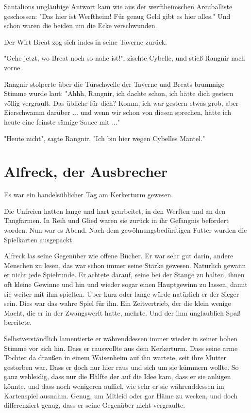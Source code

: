 Santalions ungläubige Antwort kam wie aus der werftheimschen Arcuballiste geschossen: "Das hier ist Werftheim! Für genug Geld gibt es hier alles." Und schon waren die beiden um die Ecke verschwunden.

Der Wirt Breat zog sich indes in seine Taverne zurück. 

"Gehe jetzt, wo Breat noch so nahe ist!", zischte Cybelle, und stieß Rangnir nach vorne. 

Rangnir stolperte über die Türschwelle der Taverne und Breats brummige Stimme wurde laut: 
"Ahhh, Rangnir, ich dachte schon, ich hätte dich gestern völlig vergrault. Das übliche für dich? Komm, ich war gestern etwas grob, aber Eierschwamm darüber ... und wenn wir schon von diesen sprechen, hätte ich heute eine feinste sämige Sauce mit ..."

"Heute nicht", sagte Rangnir. "Ich bin hier wegen Cybelles Mantel."










\newpage
\section{Alfreck, der Ausbrecher}

Es war ein handelsüblicher Tag am Kerkerturm gewesen.

Die Unfreien hatten lange und hart gearbeitet, in den Werften und an den Tangfarmen. In Reih und Glied waren sie zurück in ihr Gefängnis befördert worden. Nun war es Abend. Nach dem gewöhnungsbedürftigen Futter wurden die Spielkarten ausgepackt.

Alfreck las seine Gegenüber wie offene Bücher. Er war sehr gut darin, andere Menschen zu lesen, das war schon immer seine Stärke gewesen. Natürlich gewann er nicht jede Spielrunde. Er achtete darauf, seine  bei der Stange zu halten, ihnen oft kleine Gewinne und hin und wieder sogar einen Hauptgewinn zu lassen, damit sie weiter mit ihm spielten. Über kurz oder lange würde natürlich er der Sieger sein. Dies war das wahre Spiel für ihn. Ein Zeitvertrieb, der die klein wenige Macht, die er in der Zwangswerft hatte, mehrte. Und der ihm unglaublich Spaß bereitete.

Selbstverständlich lamentierte er währenddessen immer wieder in seiner hohen Stimme vor sich hin. Dass er rauswollte aus dem Kerkerturm. Dass seine arme Tochter da draußen in einem Waisenheim auf ihn wartete, seit ihre Mutter gestorben war. Dass er doch nur hier raus und sich um sie kümmern wollte. So ganz wehleidig, dass nur die Hälfte der  auf die Idee kam, dass er sie anlügen könnte, und dass noch wenigeren auffiel, wie sehr er sie währenddessen im Kartenspiel ausnahm. Genug, um Mitleid oder gar Häme zu wecken, und doch differenziert genug, dass er seine Gegenüber nicht vergraulte.


